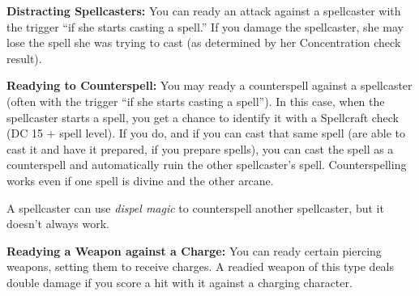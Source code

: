 \documentclass{article}
\begin{document}
\textbf{Distracting Spellcasters:} You can ready an attack against a spellcaster 
with the trigger ``if she starts casting a spell.'' If you damage the spellcaster, 
she may lose the spell she was trying to cast (as determined by her Concentration 
check result).

\textbf{Readying to Counterspell:} You may ready a counterspell against a spellcaster 
(often with the trigger ``if she starts casting a spell''). In this case, when 
the spellcaster starts a spell, you get a chance to identify it with a Spellcraft 
check (DC 15 + spell level). If you do, and if you can cast that same spell (are 
able to cast it and have it prepared, if you prepare spells), you can cast the 
spell as a counterspell and automatically ruin the other spellcaster's spell. Counterspelling 
works even if one spell is divine and the other arcane.

A spellcaster can use \textit{dispel magic }to counterspell another spellcaster, 
but it doesn't always work.

\textbf{Readying a Weapon against a Charge:} You can ready certain piercing weapons, 
setting them to receive charges. A readied weapon of this type deals double damage 
if you score a hit with it against a charging character.

\newpage
\end{document}
